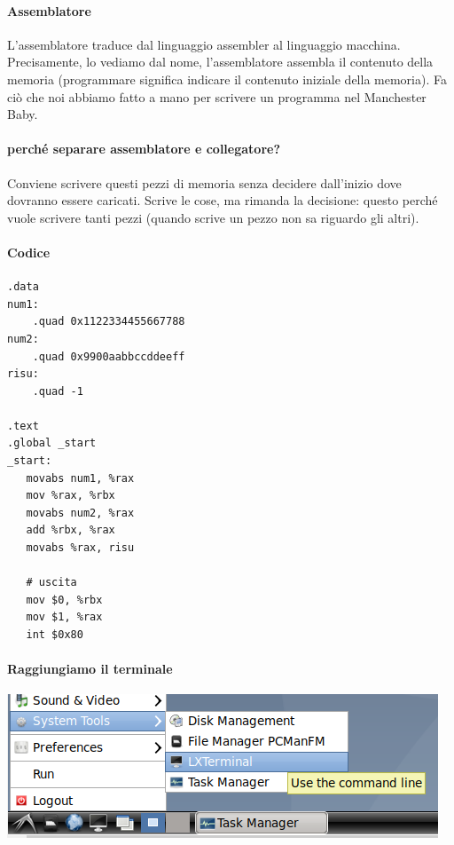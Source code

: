 \documentclass[11pt]{report}
\theoremstyle{definition}
\begin{document}
\paragraph{Assemblatore} L'assemblatore traduce dal linguaggio assembler al linguaggio macchina. Precisamente, lo vediamo dal nome, l'assemblatore assembla il contenuto della memoria (programmare significa indicare il contenuto iniziale della memoria). Fa ciò che noi abbiamo fatto a mano per scrivere un programma nel Manchester Baby.
\paragraph{perché separare assemblatore e collegatore?} Conviene scrivere questi pezzi di memoria senza decidere dall'inizio dove dovranno essere caricati. Scrive le cose, ma rimanda la decisione: questo perché vuole scrivere tanti pezzi (quando scrive un pezzo non sa riguardo gli altri). 

\paragraph{Codice}
\small
\begin{verbatim}
.data
num1:
    .quad 0x1122334455667788
num2:
    .quad 0x9900aabbccddeeff
risu:
    .quad -1
    
.text
.global _start
_start:
   movabs num1, %rax
   mov %rax, %rbx
   movabs num2, %rax
   add %rbx, %rax
   movabs %rax, risu
	
   # uscita
   mov $0, %rbx   
   mov $1, %rax
   int $0x80
\end{verbatim}
\normalsize
\paragraph{Raggiungiamo il terminale}
\begin{center}
	\includegraphics{img/138.PNG}
\end{center}
\end{document}
